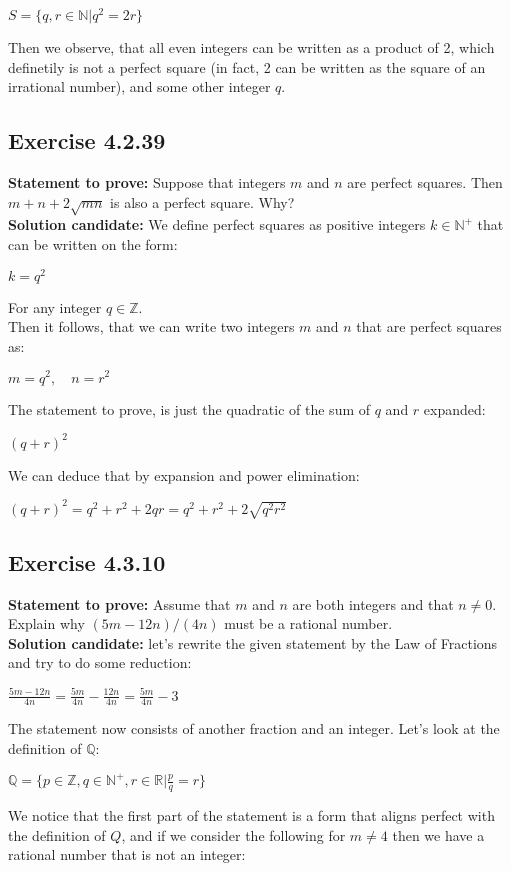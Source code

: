 \documentclass{report}
\newcommand{\cent}[1]{\begin{center}#1\end{center}}
\newcommand{\doubleR}{\mathbb{R}}
\newcommand{\doubleZ}{\mathbb{Z}}
\newcommand{\doubleN}{\mathbb{N}}
\newcommand{\doubleQ}{\mathbb{Q}}
\newcommand{\Prove}{\textbf{Statement to prove: }}
\newcommand{\Solution}{\textbf{Solution candidate: }}
\newcommand{\QED}{\boxed{}}
\newcommand{\Exercise}[1]{\subsection{Exercise #1}}
\begin{document}
	\cent{$S = \{q,r \in \doubleN | q^2 = 2r\}$}
	
	Then we observe, that all even integers can be written as  a product of 2, which definetily is not a perfect square (in fact, 2 can be written as the square of an irrational number), and some other integer $q$.\\
	\QED
	
	\Exercise{4.2.39}
	
	\Prove
	Suppose that integers $m$ and $n$ are perfect squares. Then $m+n+2\sqrt{mn}$ is also a perfect square. Why?\\
	
	\Solution
	We define perfect squares as positive integers $k \in \doubleN^+$ that can be written on the form:
	
 	\cent{$k = q^2$}
 	
 	For any integer $q \in \doubleZ$.\\
 	
 	Then it follows, that we can write two integers $m$ and $n$ that are perfect squares as:
 	
 	\cent{$m = q^2, \quad n = r^2$}
	
	The statement to prove, is just the quadratic of the sum of $q$ and $r$ expanded:
	 \cent{$(q+r)^2$} 
	 
	 We can deduce that by expansion and power elimination:
	 
	\cent{$(q+r)^2 = q^2+r^2 + 2qr =q^2+r^2 + 2\sqrt{q^2 r^2} $}
	
	\QED	 
	
	\Exercise{4.3.10}
	
	\Prove
	Assume that $m$ and $n$ are both integers and that  $n\neq 0$. Explain why $(5m -12n)/(4n)$ must be a rational number.\\
	
	\Solution
	let's rewrite the given statement by the Law of Fractions and try to do some reduction:
	
	\cent{$\frac{5m-12n}{4n} = \frac{5m}{4n} - \frac{12n}{4n} = \frac{5m}{4n} - 3 $}
	
	The statement now consists of another fraction and an integer. Let's look at the definition of $\doubleQ$:
	
	\cent{$\doubleQ = \{p \in \doubleZ, q \in \doubleN^+, r \in \doubleR | \frac{p}{q} = r\}$}
	
	We notice that the first part of the statement is a form that aligns perfect with the definition of $Q$, and if we consider the following for $m \neq 4$ then we have a rational number that is not an integer:
	
\end{document}
